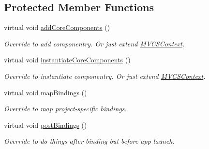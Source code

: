 \subsection*{Protected Member Functions}
\begin{DoxyCompactItemize}
\item 
\hypertarget{classstrange_1_1extensions_1_1context_1_1impl_1_1_context_a57e5e9aeb378aca525f8f28a426d59cc}{virtual void \hyperlink{classstrange_1_1extensions_1_1context_1_1impl_1_1_context_a57e5e9aeb378aca525f8f28a426d59cc}{add\-Core\-Components} ()}\label{classstrange_1_1extensions_1_1context_1_1impl_1_1_context_a57e5e9aeb378aca525f8f28a426d59cc}

\begin{DoxyCompactList}\small\item\em Override to add componentry. Or just extend \hyperlink{classstrange_1_1extensions_1_1context_1_1impl_1_1_m_v_c_s_context}{M\-V\-C\-S\-Context}. \end{DoxyCompactList}\item 
\hypertarget{classstrange_1_1extensions_1_1context_1_1impl_1_1_context_a0287e4a7fd7301dc38ee91f7bc75a899}{virtual void \hyperlink{classstrange_1_1extensions_1_1context_1_1impl_1_1_context_a0287e4a7fd7301dc38ee91f7bc75a899}{instantiate\-Core\-Components} ()}\label{classstrange_1_1extensions_1_1context_1_1impl_1_1_context_a0287e4a7fd7301dc38ee91f7bc75a899}

\begin{DoxyCompactList}\small\item\em Override to instantiate componentry. Or just extend \hyperlink{classstrange_1_1extensions_1_1context_1_1impl_1_1_m_v_c_s_context}{M\-V\-C\-S\-Context}. \end{DoxyCompactList}\item 
\hypertarget{classstrange_1_1extensions_1_1context_1_1impl_1_1_context_a69ab00c1a523096ebc8d1a31738296e2}{virtual void \hyperlink{classstrange_1_1extensions_1_1context_1_1impl_1_1_context_a69ab00c1a523096ebc8d1a31738296e2}{map\-Bindings} ()}\label{classstrange_1_1extensions_1_1context_1_1impl_1_1_context_a69ab00c1a523096ebc8d1a31738296e2}

\begin{DoxyCompactList}\small\item\em Override to map project-\/specific bindings. \end{DoxyCompactList}\item 
\hypertarget{classstrange_1_1extensions_1_1context_1_1impl_1_1_context_a780e6a87f077918c7ecf0709277f9b21}{virtual void \hyperlink{classstrange_1_1extensions_1_1context_1_1impl_1_1_context_a780e6a87f077918c7ecf0709277f9b21}{post\-Bindings} ()}\label{classstrange_1_1extensions_1_1context_1_1impl_1_1_context_a780e6a87f077918c7ecf0709277f9b21}

\begin{DoxyCompactList}\small\item\em Override to do things after binding but before app launch. \end{DoxyCompactList}\end{DoxyCompactItemize}
